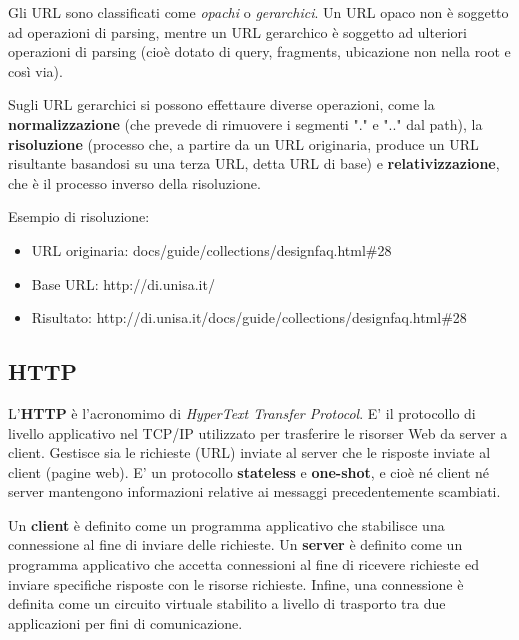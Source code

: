 Gli URL sono classificati come \textit{opachi} o \textit{gerarchici}. Un URL opaco non è soggetto ad operazioni di parsing, mentre un URL gerarchico è soggetto ad ulteriori operazioni di parsing (cioè dotato di query, fragments, ubicazione non nella root e così via). 

\vspace{3mm}

Sugli URL gerarchici si possono effettaure diverse operazioni, come la \textbf{normalizzazione} (che prevede di rimuovere i segmenti "." e ".." dal path), la \textbf{risoluzione} (processo che, a partire da un URL originaria, produce un URL risultante basandosi su una terza URL, detta URL di base) e \textbf{relativizzazione}, che è il processo inverso della risoluzione.

\vspace{3mm}

Esempio di risoluzione:
\begin{itemize}
    \item URL originaria: docs/guide/collections/designfaq.html\#28
    \item Base URL: http://di.unisa.it/
    \item Risultato: http://di.unisa.it/docs/guide/collections/designfaq.html\#28
\end{itemize}

\subsection{HTTP}

L'\textbf{HTTP} è l'acronomimo di \textit{HyperText Transfer Protocol}. E' il protocollo di livello applicativo nel TCP/IP utilizzato per trasferire le risorser Web da server a client. Gestisce sia le richieste (URL) inviate al server che le risposte inviate al client (pagine web). E' un protocollo \textbf{stateless} e \textbf{one-shot}, e cioè né client né server mantengono informazioni relative ai messaggi precedentemente scambiati.

\vspace{3mm}

Un \textbf{client} è definito come un programma applicativo che stabilisce una connessione al fine di inviare delle richieste.
Un \textbf{server} è definito come un programma applicativo che accetta connessioni al fine di ricevere richieste ed inviare specifiche risposte con le risorse richieste.
Infine, una connessione è definita come un circuito virtuale stabilito a livello di trasporto tra due applicazioni per fini di comunicazione.

